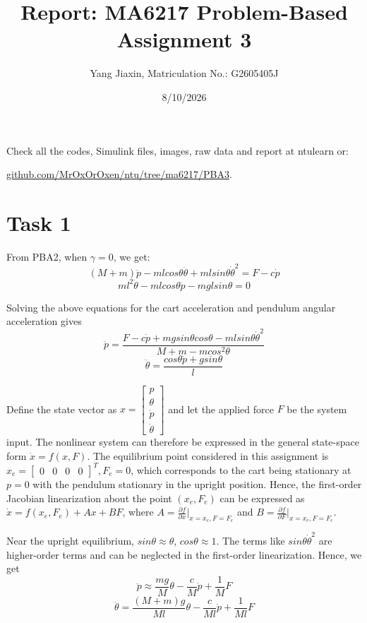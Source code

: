 \documentclass[12pt]{article}
\title{Report: MA6217 Problem-Based Assignment 3}
\author{Yang Jiaxin, Matriculation No.: G2605405J}
\date{8/10/2026}
\begin{document}
\maketitle

Check all the codes, Simulink files, images, raw data and report at ntulearn or:

\href{https://github.com/MrOxOrOxen/ntu/tree/ma6217/PBA3}{github.com/MrOxOrOxen/ntu/tree/ma6217/PBA3}.

\section{Task 1}

From PBA2, when $\gamma=0$, we get:
$$(M+m)\ddot{p} - mlcos\theta\ddot{\theta} + mlsin\theta\dot{\theta}^2 = F - c\dot{p}$$
$$ml^2\ddot{\theta} - mlcos\theta\ddot{p} - mglsin\theta = 0$$

Solving the above equations for the cart acceleration and pendulum angular acceleration gives
$$\ddot{p} = \frac{F-c\dot{p}+mgsin\theta cos\theta - mlsin\theta \dot{\theta}^2}{M+m-mcos^2\theta}$$
$$\ddot{\theta} = \frac{cos\theta \ddot{p} + gsin\theta}{l}$$

Define the state vector as $x = \begin{bmatrix}p \\ \theta \\ \dot{p} \\ \dot{\theta}\end{bmatrix}$ and let the applied force $F$ be the system input. The nonlinear system can therefore be expressed in the general state-space form $\dot{x} = f(x, F)$. The equilibrium point considered in this assignment is $x_e = \begin{bmatrix}0 & 0 & 0 & 0\end{bmatrix}^T, F_e = 0$, which corresponds to the cart being stationary at $p=0$ with the pendulum stationary in the upright position. Hence, the first-order Jacobian linearization about the point $(x_e, F_e)$ can be expressed as $\dot{x} = f(x_e, F_e) + Ax + BF$, where $A = \frac{\partial f}{\partial x}|_{x=x_e, F = F_e}$ and $B = \frac{\partial f}{\partial F}|_{x=x_e, F = F_e}$.

Near the upright equilibrium, $sin\theta \approx \theta$, $cos\theta \approx 1$. The terms like $sin\theta \dot{\theta}^2$ are higher-order terms and can be neglected in the first-order linearization. Hence, we get
$$\ddot{p} \approx \frac{mg}{M}\theta - \frac{c}{M}\dot{p} + \frac{1}{M}F$$
$$\ddot{\theta} = \frac{(M+m)g}{Ml}\theta - \frac{c}{Ml}\dot{p} + \frac{1}{Ml}F$$
\end{document}
